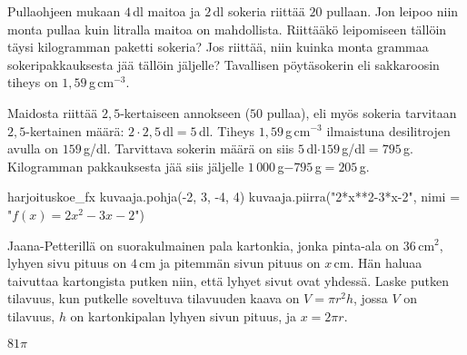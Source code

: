 \begin{multicols}{2}
\begin{tehtava}
Pullaohjeen mukaan $4$\,dl maitoa ja $2$\,dl sokeria riittää $20$ pullaan. Jon leipoo niin monta pullaa kuin litralla maitoa on mahdollista. Riittääkö leipomiseen tällöin täysi kilogramman paketti sokeria? Jos riittää, niin kuinka monta grammaa sokeripakkauksesta jää tällöin jäljelle? Tavallisen pöytäsokerin eli sakkaroosin tiheys on $1,59$\,g\,cm$^{-3}$.
	\begin{vastaus}
Maidosta riittää $2,5$-kertaiseen annokseen ($50$ pullaa), eli myös sokeria tarvitaan $2,5$-kertainen määrä: $2\cdot2,5$\,dl$=5$\,dl. Tiheys $1,59$\,g\,cm$^{-3}$ ilmaistuna desilitrojen avulla on $159$\,g/dl. Tarvittava sokerin määrä on siis $5$\,dl$\cdot159$\,g/dl$=795$\,g. Kilogramman pakkauksesta jää siis jäljelle $1\,000$\,g$-795$\,g$=205$\,g.
	\end{vastaus}
\end{tehtava}
	
\begin{luoKuva}{harjoituskoe_fx}
    kuvaaja.pohja(-2, 3, -4, 4)
    kuvaaja.piirra("2*x**2-3*x-2", nimi = "$f(x)=2x^2-3x-2$")
\end{luoKuva}

\begin{tehtava}
	\begin{vastaus}
	\end{vastaus}
		\begin{center}
			\naytaKuva{harjoituskoe_fx}
		\end{center}
\end{tehtava}

\begin{tehtava}
Jaana-Petterillä on suorakulmainen pala kartonkia, jonka pinta-ala on $36$\,cm$^2$, lyhyen sivu pituus on $4$\,cm ja pitemmän sivun pituus on $x$\,cm. Hän haluaa taivuttaa kartongista putken niin, että lyhyet sivut ovat yhdessä. Laske putken tilavuus, kun putkelle soveltuva tilavuuden kaava on $V=\pi r^2 h$, jossa $V$ on tilavuus, $h$ on kartonkipalan lyhyen sivun pituus, ja $x=2\pi r$.    
	\begin{vastaus}
$81\pi$
	\end{vastaus}
\end{tehtava}


\end{multicols}
